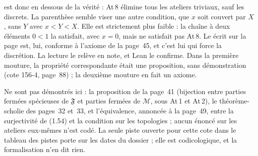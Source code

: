 \noindent {} est donc en dessous de la vérité : At\,8 élimine tous les ateliers triviaux, sauf les discrets. La parenthèse  semble viser une autre condition, que $x$ soit couvert par $X$, sans $Y$ avec $x < Y < X$. Elle est strictement plus faible : la chaîne à deux éléments $0 < 1$ la satisfait, avec $x = 0$, mais ne satisfait pas At\,8. Le  écrit sur la page est, lui, conforme à l'axiome de la page~45, et c'est lui qui force la discrétion. La lecture le relève en note, et Lean le confirme. Dans la première mouture, la propriété correspondante était une proposition, sans démonstration (cote 156-4, page~88) ; la deuxième mouture en fait un axiome.

Ne sont pas démontrés ici : la proposition de la page~41 (bijection entre parties fermées spécieuses de $\mathfrak F$ et parties fermées de $\mathcal M$, sous At\,1 et At\,2), le théorème-scholie des pages~32 et~33, et l'équivalence, annoncée à la page~49, entre la surjectivité de (1.54) et la condition sur les topologies ; aucun énoncé sur les ateliers eux-mêmes n'est codé. La seule piste ouverte pour cette cote dans le tableau des pistes porte sur les dates du dossier ; elle est codicologique, et la formalisation n'en dit rien.
